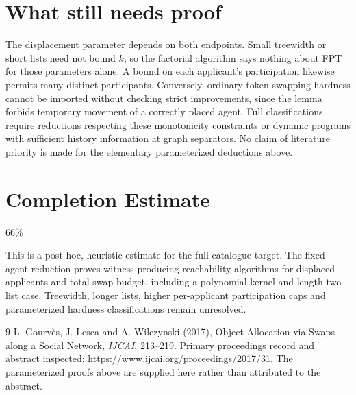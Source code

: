 \documentclass[11pt]{article}
\begin{document}
\section*{What still needs proof}
The displacement parameter depends on both endpoints. Small treewidth or short lists need not bound $k$, so the factorial algorithm says nothing about FPT for those parameters alone. A bound on each applicant's participation likewise permits many distinct participants. Conversely, ordinary token-swapping hardness cannot be imported without checking strict improvements, since the lemma forbids temporary movement of a correctly placed agent. Full classifications require reductions respecting these monotonicity constraints or dynamic programs with sufficient history information at graph separators. No claim of literature priority is made for the elementary parameterized deductions above.

\section{Completion Estimate}
66\%

This is a post hoc, heuristic estimate for the full catalogue target.
The fixed-agent reduction proves witness-producing reachability algorithms for displaced applicants and total swap budget, including a polynomial kernel and length-two-list case. Treewidth, longer lists, higher per-applicant participation caps and parameterized hardness classifications remain unresolved.

\begin{thebibliography}{9}
 L. Gourv\`es, J. Lesca and A. Wilczynski (2017), Object Allocation via Swaps along a Social Network, \emph{IJCAI}, 213--219. Primary proceedings record and abstract inspected: \url{https://www.ijcai.org/proceedings/2017/31}. The parameterized proofs above are supplied here rather than attributed to the abstract.
\end{thebibliography}
\end{document}
